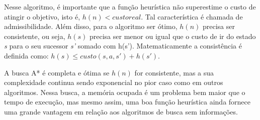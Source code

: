 \documentclass[brazil,]{article}
\begin{document}
Nesse algoritmo, é importante que a função heurística não superestime o
custo de atingir o objetivo, isto é, \(h(n) < custo real\). Tal
característica é chamada de admissibilidade. Além disso, para o
algoritmo ser ótimo, \(h(n)\) precisa ser consistente, ou seja, \(h(s)\)
precisa ser menor ou igual que o custo de ir do estado \emph{s} para o
seu sucessor \emph{s'} somado com h(s'). Matematicamente a consistência
é definida como: \(h(s) \leq custo(s, a, s') + h(s')\).

A busca A* é completa e ótima se \(h(n)\) for consistente, mas a sua
complexidade continua sendo exponencial no pior caso como em outros
algoritmos. Nessa busca, a memória ocupada é um problema bem maior que o
tempo de execução, mas mesmo assim, uma boa função heurística ainda
fornece uma grande vantagem em relação aos algoritmos de busca sem
informações.
\end{document}
